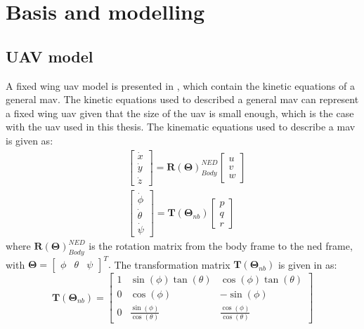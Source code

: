 \chapter{Basis and modelling}
\section{UAV model}
A fixed wing \gls{uav} model is presented in \citep{beard2012small}, which contain the kinetic equations of a general \gls{mav}. The kinetic equations used to described a general \gls{mav} can represent a fixed wing \gls{uav} given that the size of the \gls{uav} is small enough, which is the case with the \gls{uav} used in this thesis. The kinematic equations used to describe a \gls{mav} is given as:
\begin{subequations}
\label{eq:kinematics}
\begin{align}\label{eq:kinematicsPosition}
& \begin{bmatrix}
\dot{x} \\
\dot{y} \\
\dot{z}
\end{bmatrix}
=
 \mathbf{R}(\mathbf{\Theta})_{Body}^{NED}\begin{bmatrix}
 u \\
 v \\
 w
 \end{bmatrix} \\
& \begin{bmatrix}
\dot{\phi} \\
\dot{\theta} \\
\dot{\psi}
\end{bmatrix}
= 
\mathbf{T}(\mathbf{\Theta}_{nb})\begin{bmatrix}
p \\
q \\
r
\end{bmatrix}\label{eq:kinematicsAttitude}
\end{align}
\end{subequations}
where $\mathbf{R}(\mathbf{\Theta})_{Body}^{NED}$ is the rotation matrix from the body frame to the \gls{ned} frame, with $\mathbf{\Theta} = \begin{bmatrix}
\phi & \theta & \psi
\end{bmatrix}^T.$ The transformation matrix $\mathbf{T}(\mathbf{\Theta}_{nb})$ is given in \citep{fossen2011handbook} as:
\begin{equation}
\mathbf{T}(\mathbf{\Theta}_{nb}) = \begin{bmatrix}
1 & \sin(\phi)\tan(\theta) & \cos(\phi)\tan(\theta) \\
0 & \cos(\phi) & -\sin(\phi) \\
0 & \frac{\sin(\phi)}{\cos(\theta)} & \frac{\cos(\phi)}{\cos(\theta)}
\end{bmatrix}
\end{equation}
